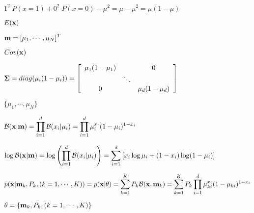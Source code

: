 \documentclass{article}
\def\lthtmlcheckvsize{\ifdim\ht\sizebox<\vsize 
  \ifdim\wd\sizebox<\hsize\expandafter\hfill\fi \expandafter\vfill
  \else\expandafter\vss\fi}%
\begin{document}
{\newpage\clearpage
{}%
$\displaystyle 1^2\;P(x=1)+0^2\;P(x=0)-\mu^2=\mu-\mu^2=\mu(1-\mu)$%
\lthtmlindisplaymathZ
\lthtmlcheckvsize\clearpage}

{\newpage\clearpage
{}%
$\displaystyle E({\bf x})$%
\lthtmlindisplaymathZ
\lthtmlcheckvsize\clearpage}

{\newpage\clearpage
{}%
$\displaystyle {\bf m}=[\mu_1,\cdots,\mu_N]^T$%
\lthtmlindisplaymathZ
\lthtmlcheckvsize\clearpage}

{\newpage\clearpage
{}%
$\displaystyle Cov({\bf x})$%
\lthtmlindisplaymathZ
\lthtmlcheckvsize\clearpage}

{\newpage\clearpage
{}%
$\displaystyle {\bf\Sigma}=diag( \mu_i(1-\mu_i) )
=\left[ \begin{array}{ccc}
\mu_1(1-\mu_1) & & 0 \\& \ddots & \\
0 & & \mu_d(1-\mu_d)\end{array}\right]$%
\lthtmlindisplaymathZ
\lthtmlcheckvsize\clearpage}

{\newpage\clearpage
{}%
$ \{\mu_1,\cdots,\mu_N\}$%
\lthtmlindisplaymathZ
\lthtmlcheckvsize\clearpage}

{\newpage\clearpage
{}%
$\displaystyle {\cal B}({\bf x}|{\bf m})=\prod_{i=1}^d {\cal B}(x_i|\mu_i)
=\prod_{i=1}^d \mu_i^{x_i}(1-\mu_i)^{1-x_i}$%
\lthtmlindisplaymathZ
\lthtmlcheckvsize\clearpage}

{\newpage\clearpage
{}%
$\displaystyle \log {\cal B}({\bf x}|{\bf m})
=\log\left(\prod_{i=1}^d {\cal B}(x_i|\mu_i)\right)
=\sum_{i=1}^d \left[ x_i\log\mu_i+(1-x_i)\log(1-\mu_i) \right]$%
\lthtmlindisplaymathZ
\lthtmlcheckvsize\clearpage}

{\newpage\clearpage
{}%
$\displaystyle p({\bf x}|{\bf m}_k,P_k,(k=1,\cdots,K))=p({\bf x}|{\bf\theta})
=\sum_{k=1}^K P_k {\cal B}({\bf x},{\bf m}_k)
=\sum_{k=1}^K P_k \prod_{i=1}^d \mu_{ki}^{x_i}(1-\mu_{ki})^{1-x_i}$%
\lthtmlindisplaymathZ
\lthtmlcheckvsize\clearpage}

{\newpage\clearpage
{}%
$ {\bf\theta}=\{{\bf m}_k,P_k,(k=1,\cdots,K)\}$%
\lthtmlindisplaymathZ
\lthtmlcheckvsize\clearpage}
\end{document}
